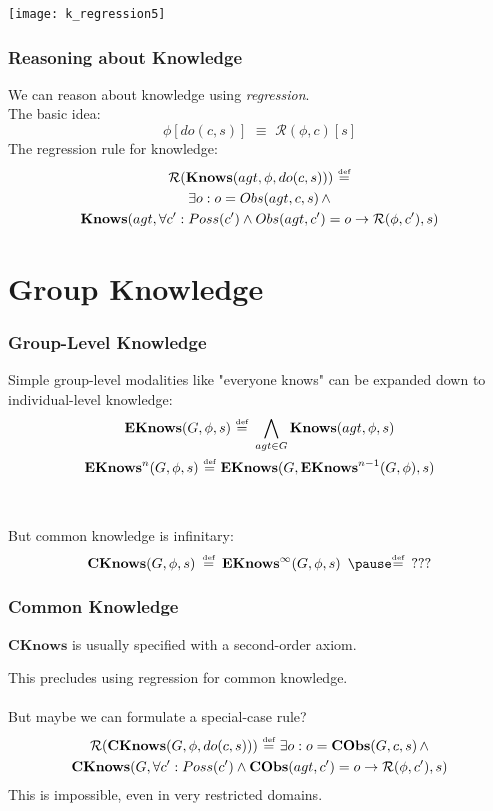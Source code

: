\documentclass[compress]{beamer}
\newcommand{\isdef}{\hbox{$\stackrel{\mbox{\tiny def}}{=}$}}
\newcommand{\Reg}{\mathcal{R}}
\newcommand{\EKnows}{\mathbf{EKnows}}
\newcommand{\Knows}{\mathbf{Knows}}
\newcommand{\CKnows}{\mathbf{CKnows}}
\begin{document}
\begin{frame}
\begin{center}
  \texttt{[image: k\_regression5]}
\end{center}
\end{frame}

\begin{frame}
\frametitle{Reasoning about Knowledge}
We can reason about knowledge using \emph{regression}.\\
The basic idea:
\begin{equation*}
\phi[do(c,s)]\,\,\equiv\,\,\Reg(\phi,c)[s]
\end{equation*}
\pause
The regression rule for knowledge:
\begin{multline*}
\Reg(\Knows(agt,\phi,do(c,s)))\,\,\isdef \\
  \exists o: o = Obs(agt,c,s)\,\wedge \\
  \Knows(agt,\forall c': Poss(c')\wedge Obs(agt,c')=o \rightarrow \Reg(\phi,c'),s)
\end{multline*}
\end{frame}

\section{Group Knowledge}

\begin{frame}
\frametitle{Group-Level Knowledge}
Simple group-level modalities like "everyone knows" can be expanded down to individual-level knowledge:
\begin{gather*}
\EKnows(G,\phi,s)\,\,\isdef\,\,\bigwedge_{agt \in G} \Knows(agt,\phi,s)\\
\EKnows^{n}(G,\phi,s)\,\,\isdef\,\,\EKnows(G,\EKnows^{n-1}(G,\phi),s)
\end{gather*}
\ \\
\ \\
\pause
But common knowledge is infinitary:
\begin{equation*}
\CKnows(G,\phi,s)\,\,\,\isdef\,\,\,\EKnows^{\infty}(G,\phi,s)\,\,\,\pause \isdef\,\,\,???
\end{equation*}
\end{frame}

\begin{frame}
\frametitle{Common Knowledge}
$\CKnows$ is usually specified with a second-order axiom.

This precludes using regression for common knowledge.
\ \\
\ \\
\pause
But maybe we can formulate a special-case rule?
\begin{multline*}
\Reg(\CKnows(G,\phi,do(c,s)))\,\,\isdef\,\,\exists o: o = \mathbf{CObs}(G,c,s)\,\wedge \\
  \CKnows(G,\forall c': Poss(c')\wedge \mathbf{CObs}(agt,c')=o \rightarrow \Reg(\phi,c'),s)
\end{multline*}
\pause
This is \alert{impossible}, even in very restricted domains.
\end{frame}
\end{document}

